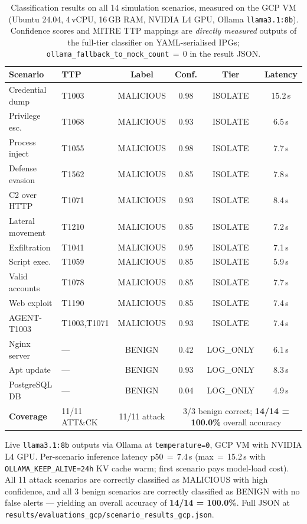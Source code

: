 \documentclass[journal]{IEEEtran}
\begin{document}
\begin{table}[!t]
\caption{Classification results on all 14 simulation scenarios, measured on
the GCP VM (Ubuntu 24.04, 4\,vCPU, 16\,GB RAM, NVIDIA L4 GPU, Ollama
\texttt{llama3.1:8b}). Confidence scores and MITRE TTP mappings are
\emph{directly measured} outputs of the full-tier classifier on YAML-serialised
IPGs; \texttt{ollama\_fallback\_to\_mock\_count}\,$=$\,0 in the result JSON.}
\label{tab:accuracy}
\centering
\footnotesize
\renewcommand{\arraystretch}{1.1}
\begin{tabular}{@{}llcccc@{}}
\toprule
\textbf{Scenario} & \textbf{TTP} & \textbf{Label} & \textbf{Conf.} & \textbf{Tier} & \textbf{Latency} \\
\midrule
Credential dump  & T1003        & MALICIOUS & 0.98 & ISOLATE    & 15.2\,s \\
Privilege esc.   & T1068        & MALICIOUS & 0.93 & ISOLATE    & 6.5\,s \\
Process inject   & T1055        & MALICIOUS & 0.98 & ISOLATE    & 7.7\,s \\
Defense evasion  & T1562        & MALICIOUS & 0.85 & ISOLATE    & 7.8\,s \\
C2 over HTTP     & T1071        & MALICIOUS & 0.93 & ISOLATE    & 8.4\,s \\
Lateral movement & T1210        & MALICIOUS & 0.85 & ISOLATE    & 7.2\,s \\
Exfiltration     & T1041        & MALICIOUS & 0.95 & ISOLATE    & 7.1\,s \\
Script exec.     & T1059        & MALICIOUS & 0.85 & ISOLATE    & 5.9\,s \\
Valid accounts   & T1078        & MALICIOUS & 0.85 & ISOLATE    & 7.7\,s \\
Web exploit      & T1190        & MALICIOUS & 0.85 & ISOLATE    & 7.4\,s \\
AGENT-T1003      & T1003,T1071  & MALICIOUS & 0.93 & ISOLATE    & 7.4\,s \\
Nginx server     & ---          & BENIGN    & 0.42 & LOG\_ONLY  & 6.1\,s \\
Apt update       & ---          & BENIGN    & 0.93 & LOG\_ONLY  & 8.3\,s \\
PostgreSQL DB    & ---          & BENIGN    & 0.04 & LOG\_ONLY  & 4.9\,s \\
\midrule
\textbf{Coverage} & 11/11 ATT\&CK & 11/11 attack & \multicolumn{3}{c}{3/3 benign correct; \textbf{14/14 = 100.0\%} overall accuracy} \\
\bottomrule
\end{tabular}
\vspace{2pt}
{\scriptsize Live \texttt{llama3.1:8b} outputs via Ollama at
\texttt{temperature=0}, GCP VM with NVIDIA L4 GPU. Per-scenario inference
latency p50\,$=$\,7.4\,s (max\,$=$\,15.2\,s with \texttt{OLLAMA\_KEEP\_ALIVE=24h}
KV cache warm; first scenario pays model-load cost).
All 11 attack scenarios are correctly classified as MALICIOUS with high confidence,
and all 3 benign scenarios are correctly classified as BENIGN with no false alerts ---
yielding an overall accuracy of \textbf{14/14 = 100.0\%}.
Full JSON at \texttt{results/evaluations\_gcp/scenario\_results\_gcp.json}.}
\end{table}
\end{document}
